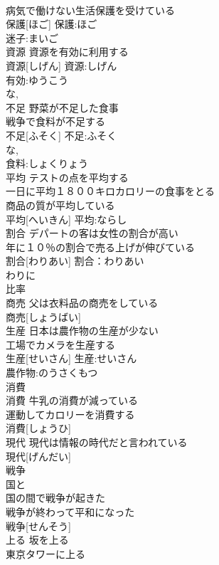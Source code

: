 \documentclass[8pt]{extreport}
\begin{document}
\begin{CJK}{UTF8}{min}
\\	病気で働けない生活保護を受けている 
\\	保護[ほご]			保護:ほご
\\	迷子:まいご
\\	資源	資源を有効に利用する 
\\	資源[しげん]			資源:しげん
\\	有効:ゆうこう
\\	な, 
\\	不足	野菜が不足した食事 
\\	戦争で食料が不足する 
\\	不足[ふそく]			不足:ふそく
\\	な, 
\\	食料:しょくりょう
\\	平均	テストの点を平均する 
\\	一日に平均１８００キロカロリーの食事をとる 
\\	商品の質が平均している 
\\	平均[へいきん]			平均:ならし
\\	割合	デパートの客は女性の割合が高い 
\\	年に１０％の割合で売る上げが伸びている 
\\	割合[わりあい]			割合：わりあい
\\	わりに 
\\	比率 
\\	商売	父は衣料品の商売をしている 
\\	商売[しょうばい]						
\\	生産	日本は農作物の生産が少ない 
\\	工場でカメラを生産する 
\\	生産[せいさん]			生産:せいさん
\\	農作物:のうさくもつ
\\	消費 
\\	消費	牛乳の消費が減っている 
\\	運動してカロリーを消費する 
\\	消費[しょうひ]						
\\	現代	現代は情報の時代だと言われている 
\\	現代[げんだい]						
\\	戦争	
\\	国と 
\\	国の間で戦争が起きた 
\\	戦争が終わって平和になった 
\\	戦争[せんそう]						
\\	上る	坂を上る 
\\	東京タワーに上る 

\end{CJK}
\end{document}
